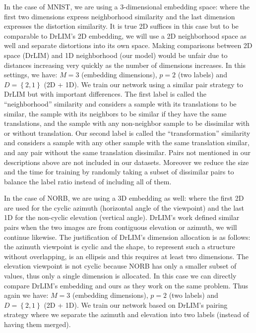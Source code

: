 \documentclass[a4paper,12pt]{report}
\begin{document}
In the case of MNIST, we are using a 3-dimensional embedding space: where the first two dimensions express neighborhood similarity and the last dimension expresses the distortion similarity.
It is true 2D suffices in this case but to be comparable to DrLIM's 2D embedding, we will use a 2D neighborhood space as well and separate distortions into its own space.
Making comparisons between 2D space (DrLIM) and 1D neighborhood (our model) would be unfair due to distances increasing very quickly as the number of dimensions increases.
In this settings, we have: $M=3$ (embedding dimensions), $p = 2$ (two labels) and $D = \left\{ 2, 1 \right\}$ (2D + 1D).
We train our network using a similar pair strategy to DrLIM but with important differences.
The first label is called the ``neighborhood'' similarity and considers a sample with its translations to be similar, the sample with its neighbors to be similar if they have the same translations, and the sample with any non-neighbor sample to be dissimilar with or without translation.
Our second label is called the ``transformation'' similarity and considers a sample with any other sample with the same translation similar, and any pair without the same translation dissimilar.
Pairs not mentioned in our descriptions above are not included in our datasets.
Moreover we reduce the size and the time for training by randomly taking a subset of dissimilar pairs to balance the label ratio instead of including all of them.

In the case of NORB, we are using a 3D embedding as well: where the first 2D are used for the cyclic azimuth (horizontal angle of the viewpoint) and the last 1D for the non-cyclic elevation (vertical angle).
DrLIM's work defined similar pairs when the two images are from contiguous elevation or azimuth, we will continue likewise.
The justification of DrLIM's dimension allocation is as follows: the azimuth viewpoint is cyclic and the shape, to represent such a structure without overlapping, is an ellipsis and this requires at least two dimensions.
The elevation viewpoint is not cyclic because NORB has only a smaller subset of values, thus only a single dimension is allocated.
In this case we can directly compare DrLIM's embedding and ours as they work on the same problem.
Thus again we have: $M=3$ (embedding dimensions), $p = 2$ (two labels) and $D = \left\{ 2, 1 \right\}$ (2D + 1D).
We train our network based on DrLIM's pairing strategy where we separate the azimuth and elevation into two labels (instead of having them merged).
\end{document}

